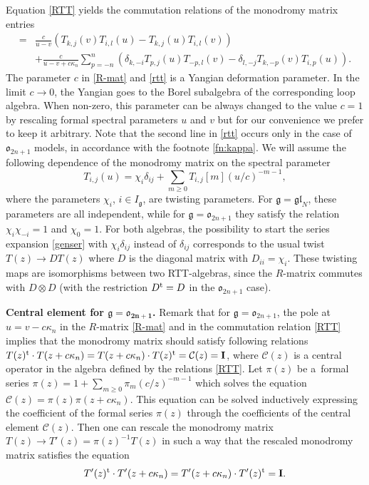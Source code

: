 \documentclass[10pt,a4paper]{amsart}
\theoremstyle{definition}
\def\r#1{\eqref{#1}}
\def\Ig{I_{\mathfrak{g}}}
\def\vk{\chi}
\begin{document}
Equation \eqref{RTT} yields the commutation relations of the monodromy matrix entries
\begin{align}
 [ T_{i,j}(u), T_{k,l}(v) ] ={}&
 \frac{c}{u-v}( T_{k,j}(v)T_{i,l}(u) - T_{k,j}(u) T_{i,l}(v) )\nonumber\\
 &+\frac{c}{u-v+c\kappa_n}\sum_{p=-n}^n(\delta_{k,-i}
 T_{p,j}(u)T_{-p,l}(v)-
 \delta_{l,-j} T_{k,-p}(v)T_{i,p}(u)).\label{rtt}
\end{align}
The parameter $c$ in \r{R-mat} and \r{rtt} is a Yangian deformation parameter.
In the limit $c\to 0$, the Yangian goes to the Borel subalgebra of the
corresponding
loop algebra. When non-zero, this parameter can be always changed to the value $c=1$
by rescaling formal spectral parameters $u$ and $v$ but for our convenience we prefer to keep it arbitrary.
Note that the second line in \eqref{rtt} occurs only in the case of $\mathfrak{o}_{2n+1}$ models, in accordance with the footnote \ref{fn:kappa}.
We will assume the following dependence of the monodromy matrix on the
spectral parameter
\begin{equation}\label{genser}
T_{i,j}(u)=\vk_i \delta_{ij}+\sum_{m\geq0} T_{i,j}[m](u/c)^{-m-1} ,
\end{equation}
where the parameters $\vk_i$, $i\in\Ig$, are twisting parameters.
For $\mathfrak{g}=\mathfrak{gl}_N$, these parameters are all independent, while for $\mathfrak{g}=\mathfrak{o}_{2n+1}$ they satisfy the relation
$\vk_i\vk_{-i}=1$ and $\vk_0 = 1$.
For both algebras, the possibility to start
the series expansion \r{genser}
with $\chi_i \delta_{ij}$ instead of $\delta_{ij}$
corresponds to the usual twist $T(z)\to D T(z)$ where $D$ is the diagonal matrix with $D_{ii}=\chi_i$.
These twisting maps are isomorphisms between two RTT-algebras, since the $R$-matrix commutes with $D\otimes D$ (with the restriction $D^{\rm t} = D$ in the $\mathfrak{o}_{2n+1}$ case).


{\bf Central element for $\boldsymbol{\mathfrak{g}=\mathfrak{o}_{2n+1}}$.}
Remark that for $\mathfrak{g}=\mathfrak{o}_{2n+1}$,
the pole at $u=v-c\kappa_n$ in the $R$-matrix \r{R-mat}
and in the commutation relation \r{RTT} implies that the monodromy matrix should satisfy following relations \cite{JLM18}
$
T(z)^{\rm t}\cdot T(z+c\kappa_n)= T(z+c\kappa_n)\cdot T(z)^{\rm t}=
\mathcal{C}(z)= \mathbf{I}$,
where $\mathcal{C}(z)$ is a central operator in the algebra defined by the relations \eqref{RTT}.
Let $\pi(z)$ be a~formal series $\pi(z)=1+\sum_{m\geq0}\pi_m (c/z)^{-m-1}$ which
solves the equation
$
\mathcal{C}(z)=\pi(z) \pi(z+c\kappa_n)$.
This equation can be solved inductively expressing the
coefficient of the formal series $\pi(z)$ through the coefficients of the
central element $\mathcal{C}(z)$. Then one can rescale the monodromy matrix~${
T(z)\to T'(z) = \pi(z)^{-1} T(z)}
$
in such a way that the rescaled monodromy matrix satisfies the equation
\begin{equation}\label{cen3}
 T'(z)^{\rm t}\cdot T'(z+c\kappa_n)= T'(z+c\kappa_n)\cdot T'(z)^{\rm t} = \mathbf{I} .
\end{equation}
\end{document}
